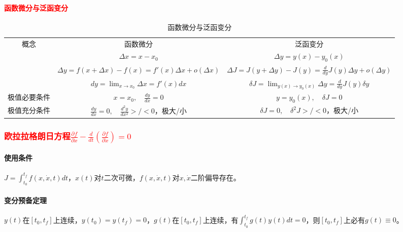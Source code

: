 \documentclass[
12pt, %
a4paper, 
oneside, %
]{scrartcl}
\begin{document}
\paragraph{\textcolor{red}{函数微分与泛函变分}}
\begin{table}[H]
\centering
\small
\begin{tabular}{|c|c|c|}
\hline
\multirow{4}{*}{概念} & 函数微分 & 泛函变分 \\
\cline{2-3}
 & $ \Delta x = x - x_0 $ & $ \Delta y = y(x) - y_0(x) $ \\
\cline{2-3}
 & $ \Delta y = f(x + \Delta x) - f(x) = f'(x) \Delta x + o(\Delta x) $ & $ \Delta J = J(y + \Delta y) - J(y) = \frac{d}{d y}J(y) \Delta y + o(\Delta y) $ \\
\cline{2-3}
 & $ d y = \lim_{x \to x_0} \Delta x = f'(x) d x $ & $ \delta J = \lim_{y(x) \to y_0(x)} \Delta y = \frac{d}{d y}J(y) \delta y $ \\
\hline
极值必要条件 & $ x = x_0, \quad \frac{d y}{d x} = 0 $ & $ y = y_0(x), \quad \delta J = 0 $ \\
\hline
极值充分条件 & $ \frac{d y}{d x} = 0, \quad \frac{d^2 y}{d x^2}>/<0 $，极大/小 & $ \delta J = 0, \quad \delta^2 J >/< 0 $，极大/小 \\
\hline
\end{tabular}
\caption{函数微分与泛函变分}
\end{table}
\subsubsection[欧拉拉格朗日方程]{\textcolor{red}{欧拉拉格朗日方程$ \frac{\partial f}{\partial x} - \frac{d}{d t}(\frac{\partial f}{\partial \dot{x}}) = 0 $}}
\paragraph{使用条件}
$ J = \int_{t_0}^{t_f} f(x, \dot{x}, t) d t $，$ x(t) $对$ t $二次可微，$ f(x, \dot{x}, t) $对$ x, \dot{x} $二阶偏导存在。
\paragraph{变分预备定理}
$ y(t) $在$ [t_0, t_f] $上连续，$ y(t_0) = y(t_f) = 0 $，$ g(t) $在$ [t_0, t_f] $上连续，有$ \int_{t_0}^{t_f} g(t) y(t) d t = 0 $，则$ [t_0, t_f] $上必有$ g(t) \equiv 0 $。
\end{document}
